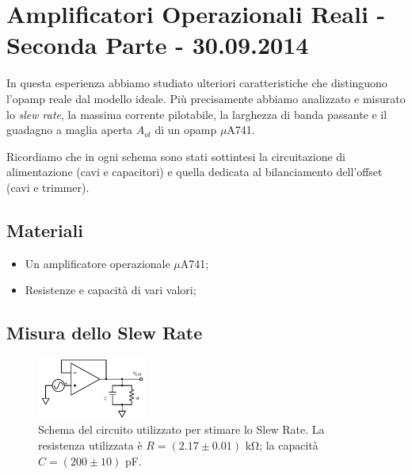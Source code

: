 \section{Amplificatori Operazionali Reali - Seconda Parte - 30.09.2014}

In questa esperienza abbiamo studiato ulteriori caratteristiche che distinguono l'opamp reale dal modello ideale.
Più precisamente abbiamo analizzato e misurato lo \textit{slew rate}, la massima corrente pilotabile, la larghezza di banda passante e il guadagno a maglia aperta $A_{ol}$ di un opamp $\mu$A741.

Ricordiamo che in ogni schema sono stati sottintesi la circuitazione di alimentazione (cavi e capacitori) e quella dedicata al bilanciamento dell'offset (cavi e trimmer).

\subsection*{Materiali}

\begin{itemize} [noitemsep]
\item Un amplificatore operazionale $\mu$A741;
\item Resistenze e capacità di vari valori;
\end{itemize}

\subsection{Misura dello Slew Rate}

\begin{figure}
  \caption{Schema del circuito utilizzato per stimare lo Slew Rate. La resistenza utilizzata è $R=(2.17\pm0.01)$ \si{\kilo\ohm}; la capacità $C=(200 \pm 10)$ \si{\pico\farad}.}
  \begin{center}
    \includegraphics[width=0.32\textwidth]{../E03/latex/slew_rate.pdf}
  \end{center}
  \label{cir3:slew_rate}
\end{figure}

